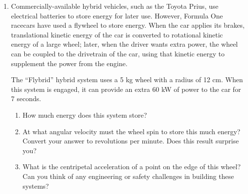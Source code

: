 \documentclass[12pt]{article}
\begin{document}
\begin{enumerate}
\item Commercially-available hybrid vehicles, such as the Toyota Prius, use electrical batteries to store energy for later use. However, Formula One racecars have used
a flywheel to store energy. When the car applies its brakes, translational kinetic energy of the car is converted to rotational kinetic energy of a large wheel;
later, when the driver wants extra power, the wheel can be coupled to the drivetrain of the car, using that kinetic energy to supplement the power from the engine.

The ``Flybrid'' hybrid system uses a 5 kg wheel with a radius of 12 cm. When this system is engaged, it can provide an extra 60 kW of power to the car for 7 seconds.

\begin{enumerate}
\item How much energy does this system store?
\item At what angular velocity must the wheel spin to store this much energy? Convert your answer to revolutions per minute. Does this result surprise you?
\item What is the centripetal acceleration of a point on the edge of this wheel? Can you think of any engineering or safety challenges in building these systems?
\end{enumerate}

\end{enumerate}
\end{document}
